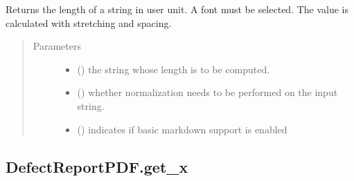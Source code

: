 \documentclass[letterpaper,10pt,english]{sphinxmanual}
\begin{document}
\begin{fulllineitems}
\begin{fulllineitems}
\label{\detokenize{generated/quality_assessment.quality_pdf_report.DefectReportPDF.get_string_width:quality_assessment.quality_pdf_report.DefectReportPDF.get_string_width}}
\sphinxAtStartPar
Returns the length of a string in user unit. A font must be selected.
The value is calculated with stretching and spacing.
\begin{quote}\begin{description}
\item[{Parameters}] \leavevmode\begin{itemize}
\item {} 
\sphinxAtStartPar
{} () \textendash{} the string whose length is to be computed.

\item {} 
\sphinxAtStartPar
{} () \textendash{} whether normalization needs to be performed on the input string.

\item {} 
\sphinxAtStartPar
{} () \textendash{} indicates if basic markdown support is enabled

\end{itemize}

\end{description}\end{quote}

\end{fulllineitems}



\subsection{DefectReportPDF.get\_x}
\label{\detokenize{generated/quality_assessment.quality_pdf_report.DefectReportPDF.get_x:defectreportpdf-get-x}}\label{\detokenize{generated/quality_assessment.quality_pdf_report.DefectReportPDF.get_x::doc}}


\end{fulllineitems}
\end{document}
